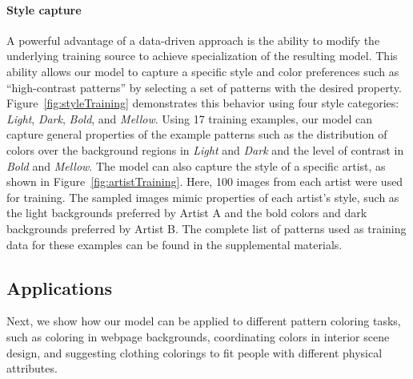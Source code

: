 \paragraph{Style capture} A powerful advantage of a data-driven approach is the ability to modify the underlying training source to achieve specialization of the resulting model. This ability allows our model to capture a specific style and color preferences such as ``high-contrast patterns'' by selecting a set of patterns with the desired property. Figure~\ref{fig:styleTraining} demonstrates this behavior using four style categories: \emph{Light}, \emph{Dark}, \emph{Bold}, and \emph{Mellow}. Using 17 training examples, our model can capture general properties of the example patterns such as the distribution of colors over the background regions in \emph{Light} and \emph{Dark} and the level of contrast in \emph{Bold} and \emph{Mellow}. The model can also capture the style of a specific artist, as shown in Figure~\ref{fig:artistTraining}. Here, 100 images from each artist were used for training. The sampled images mimic properties of each artist's style, such as the light backgrounds preferred by Artist A and the bold colors and dark backgrounds preferred by Artist B. The complete list of patterns used as training data for these examples can be found in the supplemental materials.

\subsection{Applications}

Next, we show how our model can be applied to different pattern coloring tasks, such as coloring in webpage backgrounds, coordinating colors in interior scene design, and suggesting clothing colorings to fit people with different physical attributes. %

